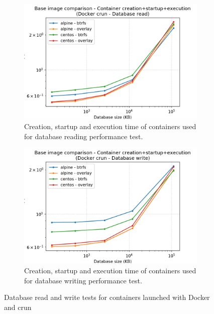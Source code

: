 \begin{figure}[h!]
    \begin{subfigure}{.5\textwidth}
      \centering
      \includegraphics[width=\linewidth]{images/image/image-full-Docker-crun---Database-read.png}
      \caption{Creation, startup and execution time of containers used for database reading performance test.}
      \label{fig:image:db-read-full}
    \end{subfigure}
    \begin{subfigure}{.5\textwidth}
      \centering
      \includegraphics[width=\linewidth]{images/image/image-full-Docker-crun---Database-write.png}
      \caption{Creation, startup and execution time of containers used for database writing performance test.}
      \label{fig:image:db-write-full}
    \end{subfigure}
    
    \caption{Database read and write tests for containers launched with Docker and crun}
\end{figure}

